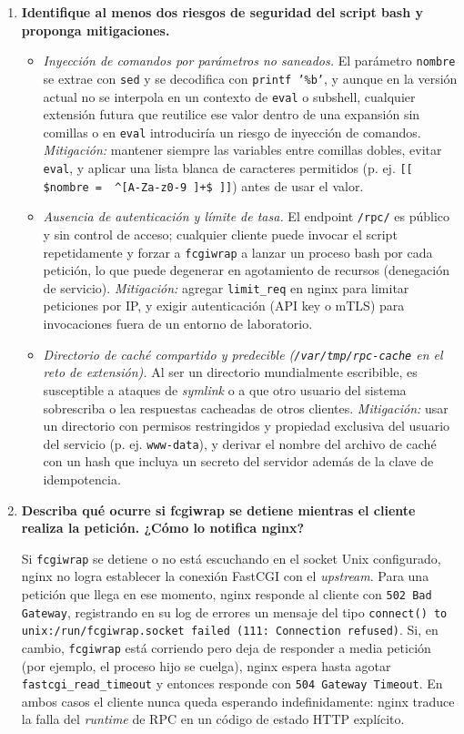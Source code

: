 \begin{enumerate}[label=\arabic*.]
\item \textbf{Identifique al menos dos riesgos de seguridad del script bash y proponga mitigaciones.}

\begin{itemize}
    \item \emph{Inyección de comandos por parámetros no saneados.} El parámetro \texttt{nombre} se extrae con \texttt{sed} y se decodifica con \texttt{printf '\%b'}, y aunque en la versión actual no se interpola en un contexto de \texttt{eval} o subshell, cualquier extensión futura que reutilice ese valor dentro de una expansión sin comillas o en \texttt{eval} introduciría un riesgo de inyección de comandos. \emph{Mitigación:} mantener siempre las variables entre comillas dobles, evitar \texttt{eval}, y aplicar una lista blanca de caracteres permitidos (p. ej. \texttt{[[ \$nombre =~ \^{}[A-Za-z0-9 ]+\$ ]]}) antes de usar el valor.
    \item \emph{Ausencia de autenticación y límite de tasa.} El endpoint \texttt{/rpc/} es público y sin control de acceso; cualquier cliente puede invocar el script repetidamente y forzar a \texttt{fcgiwrap} a lanzar un proceso bash por cada petición, lo que puede degenerar en agotamiento de recursos (denegación de servicio). \emph{Mitigación:} agregar \texttt{limit\_req} en nginx para limitar peticiones por IP, y exigir autenticación (API key o mTLS) para invocaciones fuera de un entorno de laboratorio.
    \item \emph{Directorio de caché compartido y predecible (\texttt{/var/tmp/rpc-cache} en el reto de extensión).} Al ser un directorio mundialmente escribible, es susceptible a ataques de \emph{symlink} o a que otro usuario del sistema sobrescriba o lea respuestas cacheadas de otros clientes. \emph{Mitigación:} usar un directorio con permisos restringidos y propiedad exclusiva del usuario del servicio (p. ej. \texttt{www-data}), y derivar el nombre del archivo de caché con un hash que incluya un secreto del servidor además de la clave de idempotencia.
\end{itemize}

\item \textbf{Describa qué ocurre si fcgiwrap se detiene mientras el cliente realiza la petición. ¿Cómo lo notifica nginx?}

Si \texttt{fcgiwrap} se detiene o no está escuchando en el socket Unix configurado, nginx no logra establecer la conexión FastCGI con el \emph{upstream}. Para una petición que llega en ese momento, nginx responde al cliente con \texttt{502 Bad Gateway}, registrando en su log de errores un mensaje del tipo \texttt{connect() to unix:/run/fcgiwrap.socket failed (111: Connection refused)}. Si, en cambio, \texttt{fcgiwrap} está corriendo pero deja de responder a media petición (por ejemplo, el proceso hijo se cuelga), nginx espera hasta agotar \texttt{fastcgi\_read\_timeout} y entonces responde con \texttt{504 Gateway Timeout}. En ambos casos el cliente nunca queda esperando indefinidamente: nginx traduce la falla del \emph{runtime} de RPC en un código de estado HTTP explícito.

\end{enumerate}
